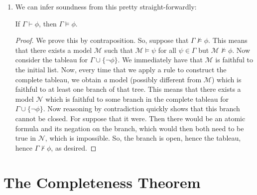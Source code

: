 \begin{enumerate}[{\thesection}.1]
                  \item We can infer soundness from this pretty
                    straight-forwardly:

                    \begin{theorem} If $\Gamma\vdash\phi$, then $\Gamma\vDash\phi$.
                      
                    \end{theorem}
                    \begin{proof}
                      We prove this by contraposition. So, suppose
                      that $\Gamma\nvDash\phi$. This means that there
                      exists a model $\mathcal{M}$  such that
                      $\mathcal{M}\vDash \psi$ for all $\psi\in\Gamma$ but
                      $\mathcal{M}\nvDash\phi$. Now consider
                      the tableau for $\Gamma\cup\{\neg\phi\}$. We
                      immediately have that $\mathcal{M}$ is faithful
                      to the initial list. Now, every time that we
                      apply a rule to construct the complete tableau,
                      we obtain \emph{a} model (possibly
                      different from $\mathcal{M}$) which is
                      faithful to at least one branch of that
                      tree. This means that there exists a model
                      $\mathcal{N}$ which is faithful to some branch
                      in the complete tableau for
                      $\Gamma\cup\{\neg\phi\}$. Now reasoning by
                      contradiction quickly shows that this branch
                      cannot be closed. For suppose that it were. Then
                      there would be an atomic formula and its
                      negation on the branch, which would then both
                      need to be true in $\mathcal{N}$, which is
                      impossible. So, the branch is open, hence the
                      tableau, hence $\Gamma\nvdash\phi$, as desired. 
                    \end{proof}

				
	\end{enumerate}


\section{The Completeness  Theorem}

